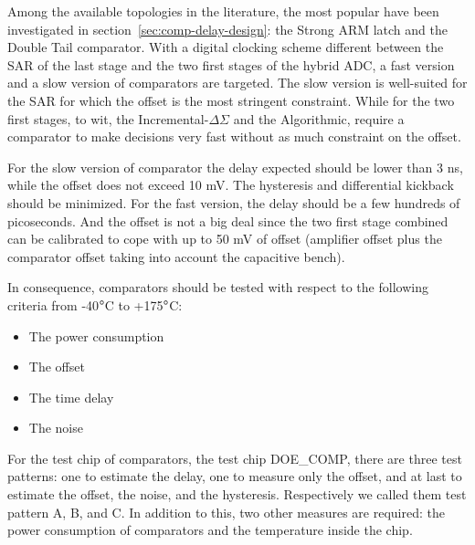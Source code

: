 Among the available topologies in the literature, the most popular have been investigated in section~\ref{sec:comp-delay-design}: the Strong ARM latch and the Double Tail comparator. With a digital clocking scheme different between the SAR of the last stage and the two first stages of the hybrid ADC, a fast version and a slow version of comparators are targeted. The slow version is well-suited for the SAR for which the offset is the most stringent constraint. While for the two first stages, to wit, the Incremental-\(\Delta \Sigma\) and the Algorithmic, require a comparator to make decisions very fast without as much constraint on the offset.

For the slow version of comparator the delay expected should be lower than 3 ns, while the offset does not exceed 10 mV. The hysteresis and differential kickback should be minimized. For the fast version, the delay should be a few hundreds of picoseconds. And the offset is not a big deal since the two first stage combined can be calibrated to cope with up to 50 mV of offset (amplifier offset plus the comparator offset taking into account the capacitive bench).

In consequence, comparators should be tested with respect to the following criteria from -40\(\degree\)C to +175\(\degree\)C\@:
\begin{itemize}
\item The power consumption
\item The offset
\item The time delay
\item The noise
\end{itemize}

For the test chip of comparators, the test chip DOE\_COMP, there are three test patterns: one to estimate the delay, one to measure only the offset, and at last to estimate the offset, the noise, and the hysteresis. Respectively we called them test pattern A, B, and C. In addition to this, two other measures are required: the power consumption of comparators and the temperature inside the chip. 


